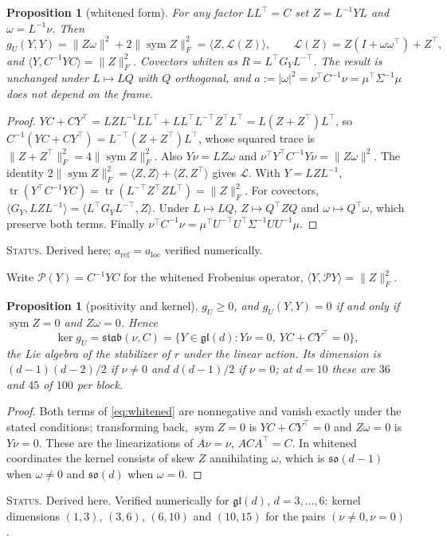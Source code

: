 \documentclass[11pt]{article}
\newtheorem{proposition}[theorem]{Proposition}
\theoremstyle{definition}
\theoremstyle{remark}
\newcommand{\gl}{\mathfrak{gl}}
\newcommand{\tr}{\operatorname{tr}}
\newcommand{\sym}{\operatorname{sym}}
\newcommand{\stab}{\mathfrak{stab}}
\newcommand{\ip}[2]{\langle #1, #2\rangle}
\newcommand{\status}[1]{\par\smallskip\noindent\textsc{Status.} #1\par\smallskip}
\begin{document}
\begin{proposition}[whitened form]\label{prop:whitened}
For any factor $LL^\top=C$ set $Z=L^{-1}YL$ and $\omega=L^{-1}\nu$. Then
\begin{equation}\label{eq:whitened}
g_U(Y,Y)=\|Z\omega\|^2+2\|\sym Z\|_F^2=\ip{Z}{\mathcal{L}(Z)},\qquad \mathcal{L}(Z)=Z(I+\omega\omega^\top)+Z^\top,
\end{equation}
and $\ip{Y}{C^{-1}YC}=\|Z\|_F^2$. Covectors whiten as $R=L^\top G_YL^{-\top}$. The result is unchanged under $L\mapsto LQ$ with $Q$ orthogonal, and $a:=|\omega|^2=\nu^\top C^{-1}\nu=\mu^\top\Sigma^{-1}\mu$ does not depend on the frame.
\end{proposition}
\begin{proof}
$YC+CY^\top=LZL^{-1}LL^\top+LL^\top L^{-\top}Z^\top L^\top=L(Z+Z^\top)L^\top$, so $C^{-1}(YC+CY^\top)=L^{-\top}(Z+Z^\top)L^\top$, whose squared trace is $\|Z+Z^\top\|_F^2=4\|\sym Z\|_F^2$. Also $Y\nu=LZ\omega$ and $\nu^\top Y^\top C^{-1}Y\nu=\|Z\omega\|^2$. The identity $2\|\sym Z\|_F^2=\ip{Z}{Z}+\ip{Z}{Z^\top}$ gives $\mathcal{L}$. With $Y=LZL^{-1}$, $\tr(Y^\top C^{-1}YC)=\tr(L^{-\top}Z^\top ZL^\top)=\|Z\|_F^2$. For covectors, $\ip{G_Y}{LZL^{-1}}=\ip{L^\top G_YL^{-\top}}{Z}$. Under $L\mapsto LQ$, $Z\mapsto Q^\top ZQ$ and $\omega\mapsto Q^\top\omega$, which preserve both terms. Finally $\nu^\top C^{-1}\nu=\mu^\top U^{-\top}U^\top\Sigma^{-1}UU^{-1}\mu$.
\end{proof}
\status{Derived here; $a_{\mathrm{ref}}=a_{\mathrm{loc}}$ verified numerically.}

Write $\mathcal{P}(Y)=C^{-1}YC$ for the whitened Frobenius operator, $\ip{Y}{\mathcal{P}Y}=\|Z\|_F^2$.

\begin{proposition}[positivity and kernel]\label{prop:kernel}
$g_U\ge0$, and $g_U(Y,Y)=0$ if and only if $\sym Z=0$ and $Z\omega=0$. Hence
\begin{equation}\label{eq:kernel}
\ker g_U=\stab(\nu,C)=\{Y\in\gl(d):Y\nu=0,\ YC+CY^\top=0\},
\end{equation}
the Lie algebra of the stabilizer of $r$ under the linear action. Its dimension is $(d-1)(d-2)/2$ if $\nu\neq0$ and $d(d-1)/2$ if $\nu=0$; at $d=10$ these are $36$ and $45$ of $100$ per block.
\end{proposition}
\begin{proof}
Both terms of \eqref{eq:whitened} are nonnegative and vanish exactly under the stated conditions; transforming back, $\sym Z=0$ is $YC+CY^\top=0$ and $Z\omega=0$ is $Y\nu=0$. These are the linearizations of $A\nu=\nu$, $ACA^\top=C$. In whitened coordinates the kernel consists of skew $Z$ annihilating $\omega$, which is $\mathfrak{so}(d-1)$ when $\omega\neq0$ and $\mathfrak{so}(d)$ when $\omega=0$.
\end{proof}
\status{Derived here. Verified numerically for $\gl(d)$, $d=3,\dots,6$: kernel dimensions $(1,3)$, $(3,6)$, $(6,10)$ and $(10,15)$ for the pairs $(\nu\neq0,\nu=0)$.}
\end{document}
